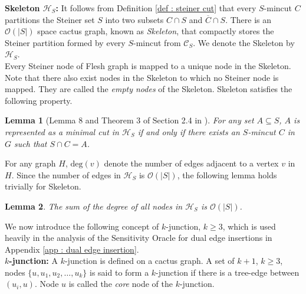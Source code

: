 \documentclass[letterpaper,11pt]{article}
\newtheorem{lemma}{Lemma}[]
\begin{document}
\noindent
\textbf{Skeleton ${\mathcal H}_S$:} It follows from Definition \ref{def : steiner cut} that every $S$-mincut $C$ partitions the Steiner set $S$ into two subsets $C\cap S$ and $\overline{C}\cap S$. There is an ${\mathcal O}(|S|)$ space cactus graph, known as \textit{Skeleton}, that compactly stores the Steiner partition formed by every $S$-mincut from ${\mathcal C}_S$. We denote the Skeleton by ${\mathcal H}_S$. \\

\noindent
Every Steiner node of Flesh graph is mapped to a unique node in the Skeleton. Note that there also exist nodes in the Skeleton to which no Steiner node is mapped. They are called the \textit{empty nodes} of the Skeleton. Skeleton satisfies the following property.  

\begin{lemma} [Lemma 8 and Theorem 3 of Section 2.4 in \cite{DBLP:conf/stoc/DinitzV94}]
    For any set $A\subseteq S$, $A$ is represented as a minimal cut in ${\mathcal H}_S$ if and only if there exists an $S$-mincut $C$ in $G$ such that $S\cap C=A$. 
    \label{lem : property of skeleton}
\end{lemma}
For any graph $H$, $\text{deg}(v)$ denote the number of edges adjacent to a vertex $v$ in $H$. Since the number of edges in ${\mathcal H}_S$ is ${\mathcal O}(|S|)$, the following lemma holds trivially for Skeleton.
\begin{lemma} \label{lem : sum of deg is order S}
    The sum of the degree of all nodes in ${\mathcal H}_S$ is ${\mathcal O}(|S|)$.
\end{lemma}




\noindent
We now introduce the following concept of $k$-junction, $k\ge 3$, which is used heavily in the analysis of the Sensitivity Oracle for dual edge insertions in Appendix \ref{app : dual edge insertion}.\\



\noindent
\textbf{$k$-junction:} A $k$-junction is defined on a cactus graph. A set of $k+1$, $k\ge 3$, nodes $\{u,u_1,u_2,\ldots,u_k\}$ is said to form a $k$-junction if there is a tree-edge between $(u_i,u)$. Node $u$ is called the \textit{core} node of the $k$-junction.\\
\end{document}

